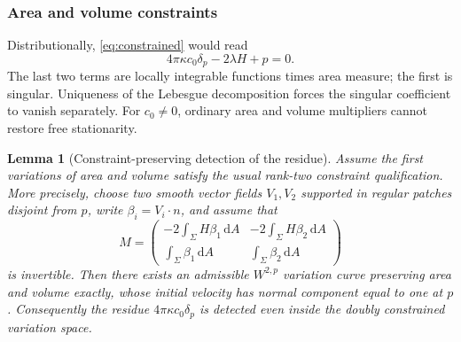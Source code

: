 \documentclass[preprint,amsmath,amssymb,aps,prl,superscriptaddress,nofootinbib,floatfix]{revtex4-2}
\newtheorem{lemma}[theorem]{Lemma}
\newcommand{\dd}{\,\mathrm d}
\begin{document}
\subsubsection{Area and volume constraints}
Distributionally, \eqref{eq:constrained} would read
\begin{equation}
4\pi\kappa c_0\delta_p-2\lambda H+p=0.\label{eq:cannotcancel}
\end{equation}
The last two terms are locally integrable functions times area measure; the first is singular. Uniqueness of the Lebesgue decomposition forces the singular coefficient to vanish separately. For \(c_0\ne0\), ordinary area and volume multipliers cannot restore free stationarity.

\begin{lemma}[Constraint-preserving detection of the residue]\label{lem:constraintbump}
Assume the first variations of area and volume satisfy the usual rank-two constraint qualification. More precisely, choose two smooth vector fields \(V_1,V_2\) supported in regular patches disjoint from \(p\), write \(\beta_i=V_i\cdot n\), and assume that
\begin{equation}
M=\begin{pmatrix}
-2\displaystyle\int_\Sigma H\beta_1\dd A&-2\displaystyle\int_\Sigma H\beta_2\dd A\\[2mm]
\displaystyle\int_\Sigma\beta_1\dd A&\displaystyle\int_\Sigma\beta_2\dd A
\end{pmatrix}
\label{eq:constraintmatrix}
\end{equation}
is invertible. Then there exists an admissible \(W^{2,p}\) variation curve preserving area and volume exactly, whose initial velocity has normal component equal to one at \(p\). Consequently the residue \(4\pi\kappa c_0\delta_p\) is detected even inside the doubly constrained variation space.
\end{lemma}
\end{document}
